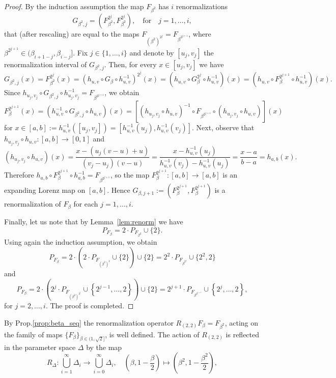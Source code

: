 \documentclass[10pt,reqno]{amsart}
\theoremstyle{plain}
\theoremstyle{assumption}
\theoremstyle{notation}
\theoremstyle{claim}
\theoremstyle{conj}
\theoremstyle{theorem}
\theoremstyle{proposition}
\theoremstyle{corollary}
\begin{document}
\begin{proof}
By the induction assumption the map $F_{\beta^2}$ has $i$ renormalizations 
$$
    G_{\beta^2,j}=(F^{2^j}_{\beta^2},F^{2^j}_{\beta^2}),\quad\text{for}\quad j=1,\ldots,i,
$$ 
that (after rescaling) are equal to the maps $F_{(\beta^2)^{2^j}}=F_{\beta^{2^{j+1}}}$, where $\beta^{2^{j+1}}\in(\beta_{i+1-j},\beta_{i-j}]$. Fix $j\in\{1,\ldots,i\}$ and denote by $[u_j,v_j]$ the renormalization interval of $G_{\beta^2,j}$. Then, for every $x\in[u_j,v_j]$ we have
$$
G_{\beta^2,j}(x)=F^{2^j}_{\beta^2}(x)=\left(h_{u,v}\circ G_{\beta}\circ h^{-1}_{u,v}\right)^{2^j}(x)=\left(h_{u,v}\circ G_{\beta}^{2^j}\circ h^{-1}_{u,v}\right)(x)=\left(h_{u,v}\circ F_{\beta}^{2^{j+1}}\circ h^{-1}_{u,v}\right)(x).
$$
Since $h_{u_j,v_j}\circ G_{\beta^2,j}\circ h^{-1}_{u_j,v_j}=F_{\beta^{2^{j+1}}}$, we obtain
$$
F_{\beta}^{2^{j+1}}(x)=\left(h_{u,v}^{-1}\circ G_{\beta^2,j}\circ h_{u,v}\right)(x)=\left[(h_{u_j,v_j}\circ h_{u,v})^{-1}\circ F_{\beta^{2^{j+1}}}\circ(h_{u_j,v_j}\circ h_{u,v})\right](x)
$$
for $x\in[a,b]:=h_{u,v}^{-1}([u_j,v_j])=[h_{u,v}^{-1}(u_j),h_{u,v}^{-1}(v_j)]$. Next, observe that $h_{u_j,v_j}\circ h_{u,v}\colon[a,b]\to[0,1]$ and
$$
\left(h_{u_j,v_j}\circ h_{u,v}\right)(x)=\frac{x-(u_j(v-u)+u)}{(v_j-u_j)(v-u)}=\frac{x-h_{u,v}^{-1}(u_j)}{h_{u,v}^{-1}(v_j)-h_{u,v}^{-1}(u_j)}=\frac{x-a}{b-a}=h_{a,b}(x).
$$
Therefore $h_{a,b}\circ F_{\beta}^{2^{j+1}}\circ h^{-1}_{a,b}=F_{\beta^{2^{j+1}}}$, so the map $F_{\beta}^{2^{j+1}}\colon[a,b]\to[a,b]$ is an expanding Lorenz map on $[a,b]$. Hence $G_{\beta,j+1}:=(F_{\beta}^{2^{j+1}},F_{\beta}^{2^{j+1}})$ is a renormalization of $F_{\beta}$ for each $j=1,\ldots,i$.

Finally, let us note that by Lemma~\ref{lem:renorm} we have
$$
P_{F_{\beta}}=2\cdot P_{F_{\beta^{2}}}\cup\{2\}.
$$
Using again the induction assumption, we obtain
$$
P_{F_{\beta}}=2\cdot\left(2\cdot P_{F_{(\beta^2)^{2}}}\cup\{2\}\right)\cup\{2\}=2^2\cdot P_{F_{\beta^{2^2}}}\cup\{2^2,2\}
$$
and
$$
P_{F_{\beta}}=2\cdot\left(2^{j}\cdot P_{F_{(\beta^2)^{2^j}}}\cup\left\lbrace2^{j-1},\ldots,2\right\rbrace\right)\cup\{2\}=2^{j+1}\cdot P_{F_{\beta^{2^{j+1}}}}\cup\left\lbrace2^{j},\ldots,2\right\rbrace,
$$
for $j=2,\ldots,i$. The proof is completed.
\end{proof}
By Prop.\ref{prop:beta_seq} the renormalization operator $R_{(2,2)}F_{\beta}=F_{\beta^2}$, acting on the family of maps $\{F_{\beta}\}_{\beta\in(1,\sqrt{2}]}$, is well defined. The action of $R_{(2,2)}$ is reflected in the parameter space $\Delta$ by the map
$$
R_{\Delta}\colon\bigcup_{i=1}^\infty\Delta_i\to\bigcup_{i=0}^\infty\Delta_i,\quad \left(\beta,1-\frac{\beta}{2}\right)\mapsto\left(\beta^2,1-\frac{\beta^2}{2}\right),
$$
\end{document}
